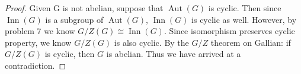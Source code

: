 \documentclass[11pt, oneside]{article}
\newcommand{\Aut}{\operatorname{Aut}}
\newcommand{\Inn}{\operatorname{Inn}}
\begin{document}
\begin{enumerate}
\begin{proof}
Given G is not abelian, suppose that $\Aut(G)$ is cyclic. Then since $\Inn(G)$ is a subgroup of $\Aut(G)$, $\Inn(G)$ is cyclic as well. However, by problem 7 we know $G/Z(G)\cong \Inn(G)$. Since isomorphism preserves cyclic property, we know $G/Z(G)$ is also cyclic. By the $G/Z$ theorem on Gallian: if $G/Z(G)$ is cyclic, then $G$ is abelian. Thus we have arrived at a contradiction.
\end{proof}

\end{enumerate}
\end{document}

